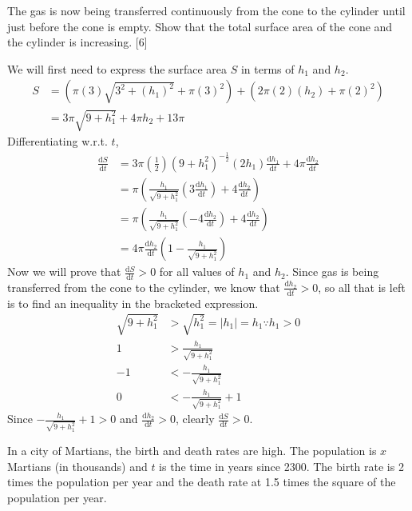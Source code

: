 \documentclass[12pt, a4 paper]{article}
\begin{document}
\begin{outline}[enumerate]
 \2 The gas is now being transferred continuously from the cone to the cylinder until just before the cone is empty. Show that the total surface area of the cone and the cylinder is increasing. \hfill[6]
 \begin{answer}
  We will first need to express the surface area \(S\) in terms of \(h_{1}\) and \(h_{2}\).
  \begin{align*}
    S &= (\pi (3)\sqrt{3^2+(h_{1})^2}+\pi(3)^2) + (2\pi (2)(h_{2}) + \pi(2)^2)\\
    &= 3\pi \sqrt{9+h_{1}^2} + 4 \pi h_{2} + 13\pi
  \end{align*}
  Differentiating w.r.t. \(t\),
  \begin{align*}
    \frac{\mathrm{d}S}{\mathrm{d}t} &= 3\pi \left(\frac{1}{2}\right) (9+h_{1}^2)^{-\frac{1}{2}}(2h_{1})\frac{\mathrm{d}h_{1}}{\mathrm{d}t} + 4 \pi \frac{\mathrm{d}h_{2}}{\mathrm{d}t} \\
    &= \pi \left(\frac{h_{1}}{\sqrt{9+h_{1}^2}}\left(3\frac{\mathrm{d}h_{1}}{\mathrm{d}t}\right)+4\frac{\mathrm{d}h_{2}}{\mathrm{d}t}\right) \\
    &= \pi \left(\frac{h_{1}}{\sqrt{9+h_{1}^2}}\left(-4\frac{\mathrm{d}h_{2}}{\mathrm{d}t}\right)+4\frac{\mathrm{d}h_{2}}{\mathrm{d}t}\right) \\
    &= 4\pi \frac{\mathrm{d}h_{2}}{\mathrm{d}t}\left(1-\frac{h_{1}}{\sqrt{9+h_{1}^2}}\right)
  \end{align*}
  Now we will prove that \(\frac{\mathrm{d}S}{\mathrm{d}t}>0\) for all values of \(h_{1}\) and \(h_{2}\). Since gas is being transferred from the cone to the cylinder, we know that \(\frac{\mathrm{d}h_{2}}{\mathrm{d}t}>0\), so all that is left is to find an inequality in the bracketed expression.
  \begin{align*}
    \sqrt{9+h_{1}^2} &> \sqrt{h_{1}^2} = |h_{1}| = h_{1} \because h_{1} > 0 \\
    1 &> \frac{h_{1}}{\sqrt{9+h_{1}^2}} \\
    -1 &< -\frac{h_{1}}{\sqrt{9+h_{1}^2}} \\
    0 &< -\frac{h_{1}}{\sqrt{9+h_{1}^2}}+1
  \end{align*}
  Since \(-\frac{h_{1}}{\sqrt{9+h_{1}^2}}+1>0\) and \(\frac{\mathrm{d}h_{2}}{\mathrm{d}t}>0\), clearly \(\frac{\mathrm{d}S}{\mathrm{d}t}>0\).
 \end{answer}
 \1 In a city of Martians, the birth and death rates are high. The population is \(x\) Martians (in thousands) and \(t\) is the time in years since 2300. The birth rate is 2 times the population per year and the death rate at 1.5 times the square of the population per year. %


\end{outline}
\end{document}
